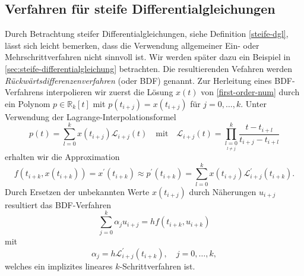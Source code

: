 
\subsection{Verfahren für steife Differentialgleichungen}
Durch Betrachtung steifer Differentialgleichungen, siehe Definition \ref{steife-dgl}, lässt sich leicht bemerken, dass
die Verwendung allgemeiner Ein- oder Mehrschrittverfahren nicht sinnvoll ist. Wir werden später dazu ein Beispiel in
\ref{sec:steife-differentialgleichung} betrachten. Die resultierenden Vefahren werden
\textit{Rückwärtsdifferenzenverfahren} (oder BDF) genannt. Zur Herleitung eines BDF-Verfahrens interpolieren wir zuerst
die Lösung $x(t)$ von \eqref{first-order-num} durch ein Polynom $p \in \mathbb{R}_k[t]$ mit $p(t_{i+j}) = x(t_{i+j})$ für
$j=0, \dots, k$. Unter Verwendung der Lagrange-Interpolationsformel
\[
    p(t) = \sum_{l=0}^{k} x(t_{i+j}) \mathcal{L}_{i+j}(t) \quad \text{mit} \quad
    \mathcal{L}_{i+j}(t) = \prod\limits_{\underset{l \neq j}{l=0}}^{k} \frac{t-t_{i+l}}{t_{i+j}-t_{i+l}}
\]
erhalten wir die Approximation
\[
    f(t_{i+k},x(t_{i+k})) = x^{\prime}(t_{i+k}) \approx p^{\prime}(t_{i+k})
    = \sum_{l=0}^{k} x(t_{i+j})\mathcal{L}^{\prime}_{i+j}(t_{i+k}).
\]
Durch Ersetzen der unbekannten Werte $x(t_{i+j})$ durch Näherungen $u_{i+j}$ resultiert das BDF-Verfahren
\[
    \sum_{j=0}^{k}\alpha_j u_{i+j} = h f(t_{i+k}, u_{i+k})
\]
mit
\[
    \alpha_j = h \mathcal{L}^{\prime}_{i+j} (t_{i+k}), \quad j=0,\dots,k,
\]
welches ein implizites lineares $k$-Schrittverfahren ist.\\

